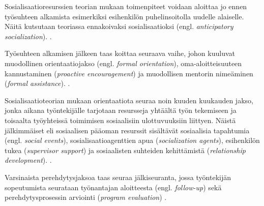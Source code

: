 \documentclass[utf8]{gradu3}
\begin{document}
Sosialisaatioresurssien teorian mukaan toimenpiteet voidaan aloittaa jo ennen työsuhteen alkamista esimerkiksi esihenkilön puhelinsoitolla uudelle alaiselle. Näitä kutsutaan teoriassa ennakoivaksi sosialisaatioksi (engl. \textit{anticipatory socialization}). \parencite{saks-gruman-2012}.

Työsuhteen alkamisen jälkeen taas koittaa seuraava vaihe, johon kuuluvat muodollinen orientaatiojakso (engl. \textit{formal orientation}), oma-aloitteisuuteen kannustaminen (\textit{proactive encouragement}) ja muodollisen mentorin nimeäminen (\textit{formal assistance}). \parencite{saks-gruman-2012}.

Sosialisaatioteorian mukaan orientaatiota seuraa noin kuuden kuukauden jakso, jonka aikana työntekijälle tarjotaan resursseja yhtäältä työn tekemiseen ja toisaalta työyhteissä toimimisen sosiaalisiin ulottuvuuksiin liittyen. Näistä jälkimmäiset eli sosiaalisen pääoman resurssit sisältävät sosiaalisia tapahtumia (engl. \textit{social events}), sosialisaatioagenttien apua (\textit{socialization agents}), esihenkilön tukea (\textit{supervisor support}) ja sosiaalisten suhteiden kehittämistä (\textit{relationship development}). \parencite{saks-gruman-2012}.

Varsinaista perehdytysjaksoa taas seuraa jälkiseuranta, jossa työntekijän sopeutumista seurataan työnantajan aloitteesta (engl. \textit{follow-up}) sekä perehdytysprosessin arviointi (\textit{program evaluation}) \parencite{saks-gruman-2012}.
\end{document}
